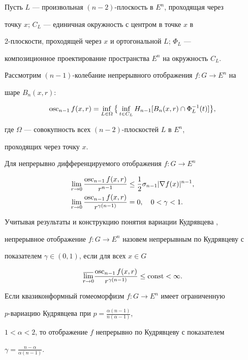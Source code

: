  


Пусть $L$ --- произвольная $(n-2)$-плоскость в $E^n$, проходящая через 


точку $x$; $C_L$ --- единичная окружность с центром в точке $x$ в 


2-плоскости, проходящей через $x$ и ортогональной $L$; $\Phi_L$ --- 


композиционное проектирование пространства $E^n$ на окружность $C_L$. 


Рассмотрим $(n-1)$-колебание непрерывного отображения $f:G\to E^n$ на 


шаре $B_n(x,r)$: 


$$ 


\osc_{n-1}f(x,r)=\inf_{L\in\Omega}\big\{\inf_{t\in C_L} 


H_{n-1}[B_n(x,r)\cap \Phi^{-1}_L(t)]\big\}, 


$$ 


где $\Omega$ --- совокупность всех $(n-2)$-плоскостей $L$ в $E^n$, 


проходящих через точку $x$. 


 


Для непрерывно дифференцируемого отображения $f:G\to E^n$ 


\begin{align*} 


\lim_{r\to0}\frac{\osc_{n-1}f(x,r)}{r^{n-1}}&\le\frac{1}{2} 


\sigma_{n-1}|\nabla f(x)|^{n-1},\\ 


\lim_{r\to0}\frac{\osc_{n-1}f(x,r)}{r^{\gamma(n-1)}}&=0,\quad 


0<\gamma<1. 


\end{align*} 


Учитывая результаты и конструкцию понятия вариации Кудрявцева \cite{1}, 


непрерывное отображение $f:G\to E^n$ назовем непрерывным по Кудрявцеву с 


показателем $\gamma\in(0,1)$, если для всех $x\in G$ 


$$ 


\underset{r\to 0}{\varlimsup} 


\frac{\osc_{n-1}f(x,r)}{r^{\gamma(n-1)}}\le\const<\infty. 


$$ 


 


\begin{thm} 


Если квазиконформный гомеоморфизм $f:G\to E^n$ имеет ограниченную 


$p$-вариацию Кудрявцева при $p=\frac{\alpha(n-1)}{n(\alpha-1)}$, 


$1<\alpha<2$, то отображение $f$ непрерывно по Кудрявцеву с показателем 


$\gamma=\frac{n-\alpha}{\alpha(n-1)}$. 


\end{thm} 


